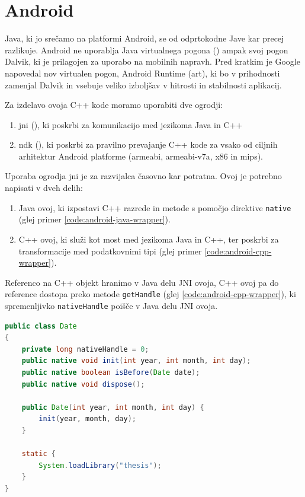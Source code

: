 \section{Android}

Java, ki jo srečamo na platformi Android, se od odprtokodne Jave kar precej razlikuje. Android ne uporablja Java virtualnega pogona () ampak svoj pogon Dalvik, ki je prilagojen za uporabo na mobilnih napravh. Pred kratkim je Google napovedal nov virtualen pogon, Android Runtime (\gls{art}), ki bo v prihodnosti zamenjal Dalvik in vsebuje veliko izboljšav v hitrosti in stabilnosti aplikacij.

Za izdelavo ovoja C++ kode moramo uporabiti dve ogrodji:

\begin{enumerate}
  \item \gls{jni} (), ki poskrbi za komunikacijo med jezikoma Java in C++
  \item \gls{ndk} (), ki poskrbi za pravilno prevajanje C++ kode za vsako od ciljnih arhitektur Android platforme (armeabi, armeabi-v7a, x86 in mips).
\end{enumerate}

Uporaba ogrodja \gls{jni}\cite{jni-docs} je za razvijalca časovno kar potratna. Ovoj je potrebno napisati v dveh delih:

\begin{enumerate}
  \item Java ovoj, ki izpostavi C++ razrede in metode s pomočjo direktive \texttt{native} (glej primer \ref{code:android-java-wrapper}).
  \item C++ ovoj, ki služi kot most med jezikoma Java in C++, ter poskrbi za transformacije med podatkovnimi tipi (glej primer \ref{code:android-cpp-wrapper}).
\end{enumerate}

Referenco na C++ objekt hranimo v Java delu JNI ovoja, C++ ovoj pa do reference dostopa preko metode \texttt{getHandle} (glej \ref{code:android-cpp-wrapper}), ki spremenljivko \texttt{nativeHandle} poišče v Java delu JNI ovoja.

\begin{lstlisting}[caption={Primer Java ovoja C++ razreda \texttt{Date}.}, label=code:android-java-wrapper, language=Java]
public class Date
{
	private long nativeHandle = 0;
	public native void init(int year, int month, int day);
	public native boolean isBefore(Date date);
	public native void dispose();

	public Date(int year, int month, int day) {
		init(year, month, day);
	}

	static {
		System.loadLibrary("thesis");
	}
}
\end{lstlisting}


